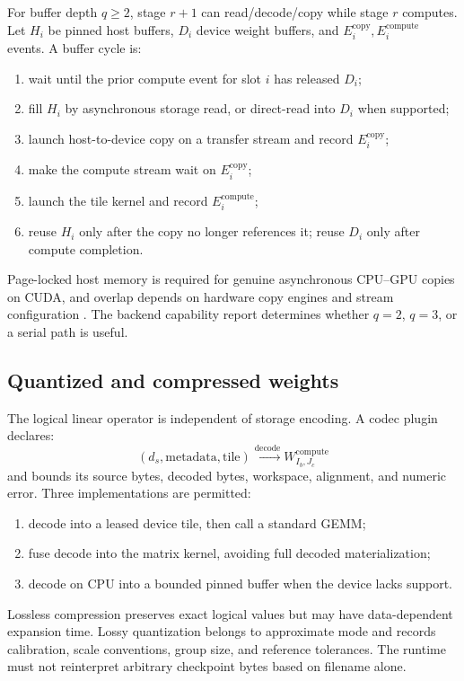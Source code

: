 For buffer depth $q\ge2$, stage $r+1$ can read/decode/copy while stage $r$ computes. Let $H_i$ be pinned host buffers, $D_i$ device weight buffers, and $E_i^{\mathrm{copy}},E_i^{\mathrm{compute}}$ events. A buffer cycle is:

\begin{enumerate}
  \item wait until the prior compute event for slot $i$ has released $D_i$;
  \item fill $H_i$ by asynchronous storage read, or direct-read into $D_i$ when supported;
  \item launch host-to-device copy on a transfer stream and record $E_i^{\mathrm{copy}}$;
  \item make the compute stream wait on $E_i^{\mathrm{copy}}$;
  \item launch the tile kernel and record $E_i^{\mathrm{compute}}$;
  \item reuse $H_i$ only after the copy no longer references it; reuse $D_i$ only after compute completion.
\end{enumerate}

Page-locked host memory is required for genuine asynchronous CPU--GPU copies on CUDA, and overlap depends on hardware copy engines and stream configuration \cite{cuda_async}. The backend capability report determines whether $q=2$, $q=3$, or a serial path is useful.

\subsection{Quantized and compressed weights}

The logical linear operator is independent of storage encoding. A codec plugin declares:
\[
  (d_s,\text{metadata},\text{tile})
  \xrightarrow{\text{decode}}
  W_{I_b,J_c}^{\mathrm{compute}}
\]
and bounds its source bytes, decoded bytes, workspace, alignment, and numeric error. Three implementations are permitted:

\begin{enumerate}
  \item decode into a leased device tile, then call a standard GEMM;
  \item fuse decode into the matrix kernel, avoiding full decoded materialization;
  \item decode on CPU into a bounded pinned buffer when the device lacks support.
\end{enumerate}

Lossless compression preserves exact logical values but may have data-dependent expansion time. Lossy quantization belongs to approximate mode and records calibration, scale conventions, group size, and reference tolerances. The runtime must not reinterpret arbitrary checkpoint bytes based on filename alone.

